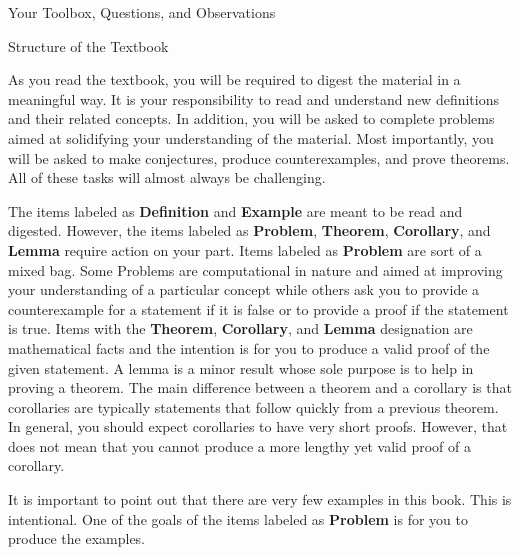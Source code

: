 \begin{section}{Your Toolbox, Questions, and Observations}
\end{section}

\begin{section}{Structure of the Textbook}

As you read the textbook, you will be required to digest the material in a meaningful way.  It is your responsibility to read and understand new definitions and their related concepts.  
In addition, you will be asked to complete problems aimed at solidifying your understanding of the material.  Most importantly, you will be asked to make conjectures, produce counterexamples, and prove theorems. All of these tasks will almost always be challenging.

The items labeled as \textbf{Definition} and \textbf{Example} are meant to be read and digested.  However, the items labeled as \textbf{Problem}, \textbf{Theorem}, \textbf{Corollary}, and \textbf{Lemma} require action on your part.  Items labeled as \textbf{Problem} are sort of a mixed bag. Some Problems are computational in nature and aimed at improving your understanding of a particular concept while others ask you to provide a counterexample for a statement if it is false or to provide a proof if the statement is true. Items with the \textbf{Theorem}, \textbf{Corollary}, and \textbf{Lemma} designation are mathematical facts and the intention is for you to produce a valid proof of the given statement.  A lemma is a minor result whose sole purpose is to help in proving a theorem. The main difference between a theorem and a corollary is that corollaries are typically statements that follow quickly from a previous theorem.  In general, you should expect corollaries to have very short proofs.  However, that does not mean that you cannot produce a more lengthy yet valid proof of a corollary.

It is important to point out that there are very few examples in this book.  This is intentional.  One of the goals of the items labeled as \textbf{Problem} is for you to produce the examples. 

\end{section}

